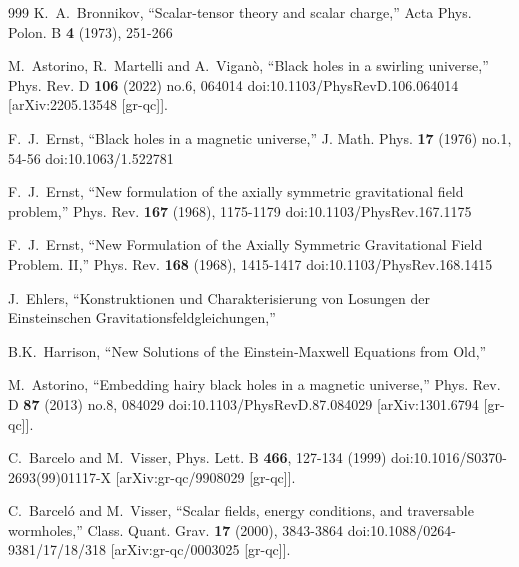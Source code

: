 \documentclass[aps,preprint,groupedaddress,nofootinbib,superscriptaddress,showkeys,showpacs,eqsecnum,amsmath,amssymb]{revtex4-1}
\begin{document}
\begin{thebibliography}{999}
K.~A.~Bronnikov,
``Scalar-tensor theory and scalar charge,''
Acta Phys. Polon. B \textbf{4} (1973), 251-266

M.~Astorino, R.~Martelli and A.~Vigan\`o,
``Black holes in a swirling universe,''
Phys. Rev. D \textbf{106} (2022) no.6, 064014
doi:10.1103/PhysRevD.106.064014
[arXiv:2205.13548 [gr-qc]].

F.~J.~Ernst,
``Black holes in a magnetic universe,''
J. Math. Phys. \textbf{17} (1976) no.1, 54-56
doi:10.1063/1.522781


F.~J.~Ernst,
``New formulation of the axially symmetric gravitational field problem,''
Phys. Rev. \textbf{167} (1968), 1175-1179
doi:10.1103/PhysRev.167.1175

F.~J.~Ernst,
``New Formulation of the Axially Symmetric Gravitational Field Problem. II,''
Phys. Rev. \textbf{168} (1968), 1415-1417
doi:10.1103/PhysRev.168.1415


J.~Ehlers,
``Konstruktionen und Charakterisierung von Losungen der Einsteinschen Gravitationsfeldgleichungen,''

B.K.~Harrison,
``New Solutions of the Einstein‐Maxwell Equations from Old,''

M.~Astorino,
``Embedding hairy black holes in a magnetic universe,''
Phys. Rev. D \textbf{87} (2013) no.8, 084029
doi:10.1103/PhysRevD.87.084029
[arXiv:1301.6794 [gr-qc]].

C.~Barcelo and M.~Visser,
Phys. Lett. B \textbf{466}, 127-134 (1999)
doi:10.1016/S0370-2693(99)01117-X
[arXiv:gr-qc/9908029 [gr-qc]].

C.~Barcel\'o and M.~Visser,
``Scalar fields, energy conditions, and traversable wormholes,''
Class. Quant. Grav. \textbf{17} (2000), 3843-3864
doi:10.1088/0264-9381/17/18/318
[arXiv:gr-qc/0003025 [gr-qc]].



\end{thebibliography}
\end{document}
